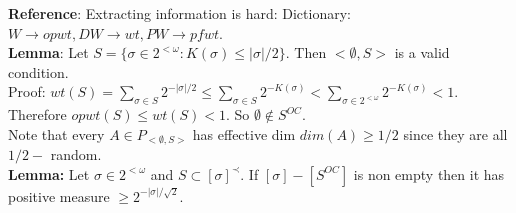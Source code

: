 \documentclass{article}
\begin{document}
   \textbf{Reference}: Extracting information is hard: Dictionary: $W \to opwt, DW \to wt, PW \to pfwt$.\\
   \textbf{Lemma}: Let $S = \{\sigma \in 2^{<\omega} : K(\sigma) \leq |\sigma| / 2\}$. Then $<\emptyset, S > $ is a valid condition. \\
   Proof: $wt(S) = \sum_{\sigma \in S} 2^{-|\sigma|/2} \leq \sum_{\sigma \in S} 2^{-K(\sigma)} < \sum_{\sigma \in 2^{<\omega}} 2^{-K(\sigma) } < 1$. Therefore $opwt(S) \leq wt(S) < 1$. So $\emptyset \not \in S^{OC}$. \\
   Note that every $A \in P_{<\emptyset, S>}$ has effective dim $dim(A) \geq 1/2$ since they are all $1/2- $ random.
   \\ \textbf{Lemma: } Let $\sigma \in 2^{<\omega}$ and $S \subset [\sigma]^\prec$. If $[\sigma] - [S^{OC}]$ is non empty then it has positive measure $\geq 2^{-|\sigma|/\sqrt 2}$.
    
\end{document}
